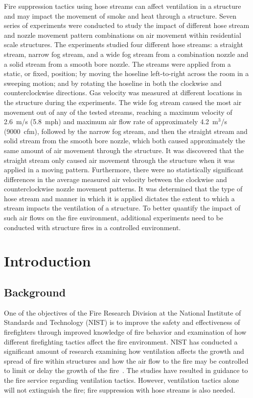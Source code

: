 \documentclass[12pt,oneside]{book}
\begin{document}
Fire suppression tactics using hose streams can affect ventilation in a structure and may impact the movement of smoke and heat through a structure. Seven series of experiments were conducted to study the impact of different hose stream and nozzle movement pattern combinations on air movement within residential scale structures. The experiments studied four different hose streams: a straight stream, narrow fog stream, and a wide fog stream from a combination nozzle and a solid stream from a smooth bore nozzle. The streams were applied from a static, or fixed, position; by moving the hoseline left-to-right across the room in a sweeping motion; and by rotating the hoseline in both the clockwise and counterclockwise directions. Gas velocity was measured at different locations in the structure during the experiments. The wide fog stream caused the most air movement out of any of the tested streams, reaching a maximum velocity of 2.6~m/s (5.8~mph) and maximum air flow rate of approximately 4.2~m$^3$/s (9000~cfm), followed by the narrow fog stream, and then the straight stream and solid stream from the smooth bore nozzle, which both caused approximately the same amount of air movement through the structure. It was discovered that the straight stream only caused air movement through the structure when it was applied in a moving pattern. Furthermore, there were no statistically significant differences in the average measured air velocity between the clockwise and counterclockwise nozzle movement patterns. It was determined that the type of hose stream and manner in which it is applied dictates the extent to which a stream impacts the ventilation of a structure. To better quantify the impact of such air flows on the fire environment, additional experiments need to be conducted with structure fires in a controlled environment.

\chapter{Introduction}
\label{chap:intro}
\section{Background}
\label{sec:background}

One of the objectives of the Fire Research Division at the National Institute of Standards and Technology (NIST) is to improve the safety and effectiveness of firefighters through improved knowledge of fire behavior and examination of how different firefighting tactics affect the fire environment. NIST has conducted a significant amount of research examining how ventilation affects the growth and spread of fire within structures and how the air flow to the fire may be controlled to limit or delay the growth of the fire~\cite{madrzykowski2009fire,kerber2009fire}. The studies have resulted in guidance to the fire service regarding ventilation tactics. However, ventilation tactics alone will not extinguish the fire; fire suppression with hose streams is also needed.
\end{document}

